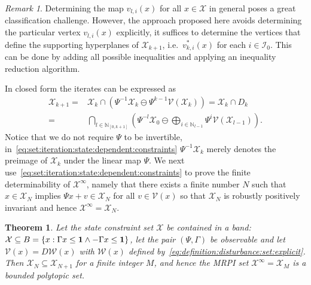 \documentclass[journal]{IEEEtran}
\newcounter{thmcount}
\newtheorem{thm}[thmcount]{Theorem}
\theoremstyle{remark}
\newtheorem{rem}[thmcount]{Remark}
\theoremstyle{definition}
\begin{document}
%
\begin{rem}
Determining the map $v_{l,i}(x)$ for all $x\in \mathcal X$ in general poses a great classification
challenge. 
%
However, the approach proposed here avoids determining the particular vertex $v_{l,i}(x)$ explicitly, it
suffices to determine the vertices that define the supporting hyperplanes of $\mathcal X_{k+1}$, i.e.~$v_{k,i}^\ast(x)$ for each $i\in\mathcal I_0$.
%
This can be done by adding all possible inequalities and applying an inequality reduction algorithm.
\end{rem}
%
In closed form the iterates can be expressed as
%
\begin{equation}\label{eq:set:iteration:state:dependent:constraints}
\begin{split}
  \mathcal X_{k+1} =& \mathcal X_k\cap\left(\Psi^{-1}\mathcal X_k \ominus \Psi^{k-1}\mathcal V(\mathcal X_k)\right)
  =\mathcal X_k\cap D_k \\
  =& \bigcap_{l\in \mathbb N_{[0,k+1]}} \left( \Psi^{-l} \mathcal X_0 \ominus \underset{i\in\mathbb N_{l-1}}{\bigoplus} 
  \Psi^i \mathcal V(\mathcal X_{l-1})\right).
\end{split}\end{equation}
%
Notice that we do not require $\Psi$ to be invertible, in~\eqref{eq:set:iteration:state:dependent:constraints} 
$\Psi^{-1}\mathcal X_k$ merely denotes the preimage of $\mathcal X_k$ under the linear map $\Psi$.
%
We next use~\eqref{eq:set:iteration:state:dependent:constraints} to prove the finite determinability of
$\mathcal X^\infty$, namely that there exists a finite number $N$ such that $x\in\mathcal X_N$ implies
$\Psi x + v \in\mathcal X_N$ for all $v\in\mathcal V(x)$ so that $\mathcal X_N$ is robustly positively invariant and hence $\mathcal X^\infty = \mathcal X_N$.
%
\begin{thm}\label{thm:finite:MRPI:set:state:dependable}
Let the state constraint set $\mathcal X$ be contained in a band: $\mathcal X\subseteq B=\{x:\Gamma x\leq{\bf{1}}\wedge 
-\Gamma x\leq{\bf{1}}\}$, let the pair $(\Psi,\Gamma)$ be observable and let $\mathcal V(x)=D\mathcal W(x)$ with 
$\mathcal W(x)$ defined by~\eqref{eq:definition:disturbance:set:explicit}. 
%
Then $\mathcal X_N\subseteq \mathcal X_{N+1}$ for a finite integer $M$, and hence the MRPI set $\mathcal X^\infty =\mathcal X_M$ 
is a bounded polytopic set.
\end{thm}
\end{document}
